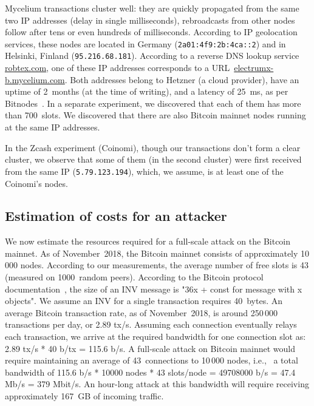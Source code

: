 Mycelium transactions cluster well: they are quickly propagated from the same two IP addresses (delay in single milliseconds), rebroadcasts from other nodes follow after tens or even hundreds of milliseconds.
According to IP geolocation services, these nodes are located in Germany (\texttt{2a01:4f9:2b:4ca::2}) and in Helsinki, Finland (\texttt{95.216.68.181}).
According to a reverse DNS lookup service \url{robtex.com}, one of these IP addresses corresponds to a URL~\url{electrumx-b.mycelium.com}.
Both addresses belong to Hetzner (a cloud provider), have an uptime of 2~months (at the time of writing), and a latency of 25~ms, as per Bitnodes~\cite{Bitnodes}.
In a separate experiment, we discovered that each of them has more than 700~slots.
We discovered that there are also Bitcoin mainnet nodes running at the same IP addresses.

In the Zcash experiment (Coinomi), though our transactions don't form a clear cluster, we observe that some of them (in the second cluster) were first received from the same IP (\texttt{5.79.123.194}), which, we assume, is at least one of the Coinomi's nodes.



\subsection{Estimation of costs for an attacker}

We now estimate the resources required for a full-scale attack on the Bitcoin mainnet.
As of November~2018, the Bitcoin mainnet consists of approximately 10\,000 nodes.
According to our measurements, the average number of free slots is 43 (measured on 1000~random peers).
According to the Bitcoin protocol documentation~\cite{BitcoinWiki}, the size of an INV message is "36x + const for message with x objects".
We assume an INV for a single transaction requires 40~bytes.
An average Bitcoin transaction rate, as of November~2018, is around 250\,000 transactions per day, or 2.89 tx/s.
Assuming each connection eventually relays each transaction, we arrive at the required bandwidth for one connection slot as: 2.89 tx/s * 40 b/tx = 115.6 b/s.
A full-scale attack on Bitcoin mainnet would require maintaining an average of 43~connections to 10\,000 nodes, i.e.,~ a total bandwidth of 115.6 b/s * 10000 nodes * 43 slots/node = 49708000 b/s = 47.4 Mb/s = 379 Mbit/s.
An hour-long attack at this bandwidth will require receiving approximately 167~GB of incoming traffic.


